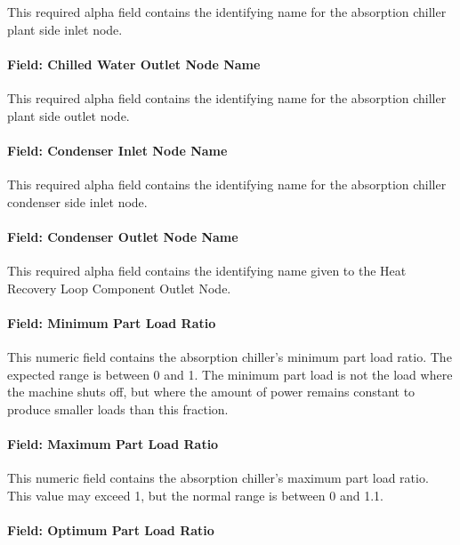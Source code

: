 This required alpha field contains the identifying name for the absorption chiller plant side inlet node.

\paragraph{Field: Chilled Water Outlet Node Name}\label{field-chilled-water-outlet-node-name-000}

This required alpha field contains the identifying name for the absorption chiller plant side outlet node.

\paragraph{Field: Condenser Inlet Node Name}\label{field-condenser-inlet-node-name}

This required alpha field contains the identifying name for the absorption chiller condenser side inlet node.

\paragraph{Field: Condenser Outlet Node Name}\label{field-condenser-outlet-node-name}

This required alpha field contains the identifying name given to the Heat Recovery Loop Component Outlet Node.

\paragraph{Field: Minimum Part Load Ratio}\label{field-minimum-part-load-ratio-001}

This numeric field contains the absorption chiller's minimum part load ratio. The expected range is between 0 and 1. The minimum part load is not the load where the machine shuts off, but where the amount of power remains constant to produce smaller loads than this fraction.

\paragraph{Field: Maximum Part Load Ratio}\label{field-maximum-part-load-ratio-001}

This numeric field contains the absorption chiller's maximum part load ratio. This value may exceed 1, but the normal range is between 0 and 1.1.

\paragraph{Field: Optimum Part Load Ratio}\label{field-optimum-part-load-ratio-001}

